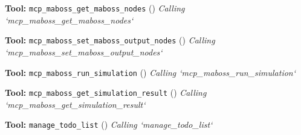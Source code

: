 \documentclass[11pt,a4paper]{article}
\begin{document}
\begin{toolokbox}
\textbf{Tool:} \texttt{mcp\_maboss\_get\_maboss\_nodes} (\checkmark)
\textit{Calling `mcp\_maboss\_get\_maboss\_nodes`}
\end{toolokbox}
\begin{toolokbox}
\textbf{Tool:} \texttt{mcp\_maboss\_set\_maboss\_output\_nodes} (\checkmark)
\textit{Calling `mcp\_maboss\_set\_maboss\_output\_nodes`}
\end{toolokbox}
\begin{toolokbox}
\textbf{Tool:} \texttt{mcp\_maboss\_run\_simulation} (\checkmark)
\textit{Calling `mcp\_maboss\_run\_simulation`}
\end{toolokbox}
\begin{toolokbox}
\textbf{Tool:} \texttt{mcp\_maboss\_get\_simulation\_result} (\checkmark)
\textit{Calling `mcp\_maboss\_get\_simulation\_result`}
\end{toolokbox}
\begin{toolokbox}
\textbf{Tool:} \texttt{manage\_todo\_list} (\checkmark)
\textit{Calling `manage\_todo\_list`}
\end{toolokbox}
\end{document}
